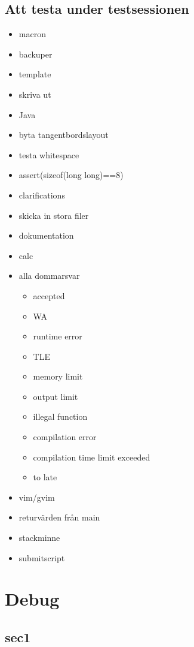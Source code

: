 \documentclass[10pt, a4paper, notitlepage]{report}
\begin{document}
\begin{multicols*}{3}
	\section{Att testa under testsessionen}
	\begin{itemize}
		\item macron
		\item backuper
		\item template
		\item skriva ut
		\item Java
		\item byta tangentbordslayout
		\item testa whitespace
		\item assert(sizeof(long long)==8)
		\item clarifications
		\item skicka in stora filer
		\item dokumentation
		\item calc
		\item alla dommarsvar
		\begin{itemize}
	 			\item accepted
	 			\item WA
	 			\item runtime error
	 			\item TLE
	 			\item memory limit
	 			\item output limit
	 			\item illegal function
	 			\item compilation error
	 			\item compilation time limit exceeded
	 			\item to late
			\end{itemize}
		\item vim/gvim
		\item returvärden från main
		\item stackminne
		\item submitscript
	\end{itemize}
	
	

	
	\chapter{Debug}
	\section{sec1}

\end{multicols*}
\end{document}

